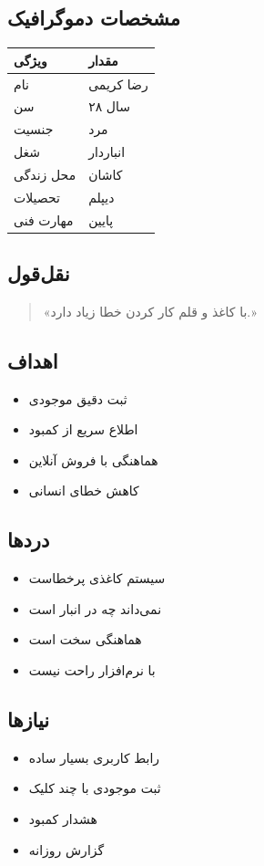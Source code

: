 \documentclass[12pt, a4paper]{article}
\begin{document}
\subsection{مشخصات دموگرافیک}
\begin{center}
\begin{tabular}{|l|l|}
\hline
\textbf{ویژگی} & \textbf{مقدار} \\
\hline
نام & رضا کریمی \\
\hline
سن & ۲۸ سال \\
\hline
جنسیت & مرد \\
\hline
شغل & انباردار \\
\hline
محل زندگی & کاشان \\
\hline
تحصیلات & دیپلم \\
\hline
مهارت فنی & پایین \\
\hline
\end{tabular}
\end{center}

\subsection{نقل‌قول}
\begin{quote}
«با کاغذ و قلم کار کردن خطا زیاد دارد.»
\end{quote}

\subsection{اهداف}
\begin{itemize}
    \item ثبت دقیق موجودی
    \item اطلاع سریع از کمبود
    \item هماهنگی با فروش آنلاین
    \item کاهش خطای انسانی
\end{itemize}

\subsection{دردها}
\begin{itemize}
    \item سیستم کاغذی پرخطاست
    \item نمی‌داند چه در انبار است
    \item هماهنگی سخت است
    \item با نرم‌افزار راحت نیست
\end{itemize}

\subsection{نیازها}
\begin{itemize}
    \item رابط کاربری بسیار ساده
    \item ثبت موجودی با چند کلیک
    \item هشدار کمبود
    \item گزارش روزانه
\end{itemize}
\end{document}
